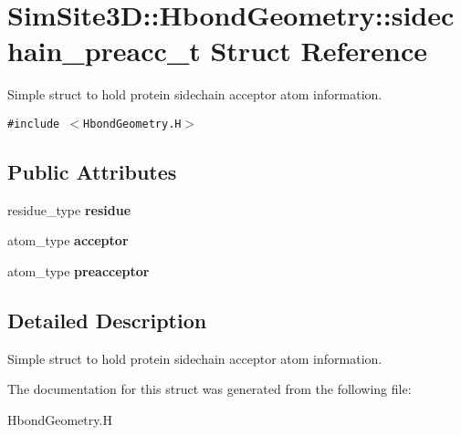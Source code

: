 \section{SimSite3D::Hbond\-Geometry::sidechain\_\-preacc\_\-t Struct Reference}
\label{structSimSite3D_1_1HbondGeometry_1_1sidechain__preacc__t}
Simple struct to hold protein sidechain acceptor atom information.  


{\tt \#include $<$Hbond\-Geometry.H$>$}

\subsection*{Public Attributes}
\begin{CompactItemize}
\item 
residue\_\-type \textbf{residue}\label{structSimSite3D_1_1HbondGeometry_1_1sidechain__preacc__t_eb2bb27d2a3ce829a482dd175d1ab5e3}

\item 
atom\_\-type \textbf{acceptor}\label{structSimSite3D_1_1HbondGeometry_1_1sidechain__preacc__t_f80b810eca83f029297a82b47cf8208d}

\item 
atom\_\-type \textbf{preacceptor}\label{structSimSite3D_1_1HbondGeometry_1_1sidechain__preacc__t_6fa0c8f17d817856ddb4bbd27a1b6857}

\end{CompactItemize}


\subsection{Detailed Description}
Simple struct to hold protein sidechain acceptor atom information. 



The documentation for this struct was generated from the following file:\begin{CompactItemize}
\item 
Hbond\-Geometry.H\end{CompactItemize}
